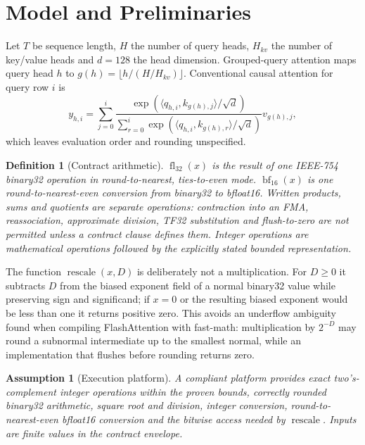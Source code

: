 \documentclass{article}
\newtheorem{Def}{Definition}[section]
\newtheorem{Ass}{Assumption}[section]
\newcommand{\fl}{\operatorname{fl}_{32}}
\newcommand{\bfround}{\operatorname{bf}_{16}}
\newcommand{\rescale}{\operatorname{rescale}}
\begin{document}
\section{Model and Preliminaries}
\label{sec:model}

Let $T$ be sequence length, $H$ the number of query heads, $H_{kv}$ the number of key/value
heads and $d=128$ the head dimension.  Grouped-query attention maps query head $h$ to
$g(h)=\lfloor h/(H/H_{kv})\rfloor$.  Conventional causal attention for query row $i$ is
\begin{equation}
  y_{h,i}=\sum_{j=0}^{i}
  \frac{\exp(\langle q_{h,i},k_{g(h),j}\rangle/\sqrt d)}
       {\sum_{r=0}^{i}\exp(\langle q_{h,i},k_{g(h),r}\rangle/\sqrt d)}
  v_{g(h),j},
  \label{eq:softmax}
\end{equation}
which leaves evaluation order and rounding unspecified.

\begin{Def}[Contract arithmetic]
\label{def:arithmetic}
$\fl(x)$ is the result of one IEEE-754 binary32 operation in round-to-nearest,
ties-to-even mode.  $\bfround(x)$ is one round-to-nearest-even conversion from binary32 to
bfloat16.  Written products, sums and quotients are separate operations: contraction into an
FMA, reassociation, approximate division, TF32 substitution and flush-to-zero are not
permitted unless a contract clause defines them.  Integer operations are mathematical
operations followed by the explicitly stated bounded representation.
\end{Def}

The function $\rescale(x,D)$ is deliberately not a multiplication.  For $D\geq 0$ it
subtracts $D$ from the biased exponent field of a normal binary32 value while preserving sign
and significand; if $x=0$ or the resulting biased exponent would be less than one it returns
positive zero.  This avoids an underflow ambiguity found when compiling FlashAttention with
fast-math: multiplication by $2^{-D}$ may round a subnormal intermediate up to the smallest
normal, while an implementation that flushes before rounding returns zero.

\begin{Ass}[Execution platform]
\label{ass:platform}
A compliant platform provides exact two's-complement integer operations within the proven
bounds, correctly rounded binary32 arithmetic, square root and division, integer conversion,
round-to-nearest-even bfloat16 conversion and the bitwise access needed by $\rescale$.
Inputs are finite values in the contract envelope.
\end{Ass}
\end{document}
